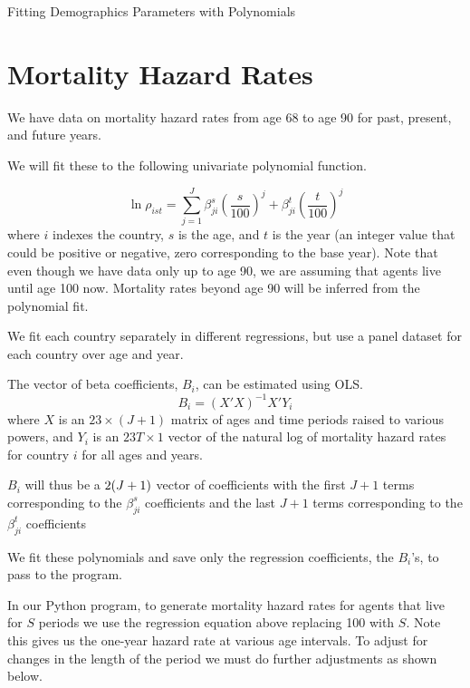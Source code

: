 \documentclass[letterpaper,12pt]{article}
\theoremstyle{definition}
\numberwithin{equation}{section}
\begin{document}
\begin{spacing}{1.5}


\LARGE{Fitting Demographics Parameters with Polynomials} \normalsize

\section{Mortality Hazard Rates}

	We have data on mortality hazard rates from age 68 to age 90 for past, present, and future years.

	We will fit these to the following univariate polynomial function.

	\begin{equation}
		\ln \rho_{ist} = \sum_{j=1}^J \beta^s_{ji} \left(\frac{s}{100}\right)^j + \beta^t_{ji} \left(\frac{t}{100}\right)^j
	\end{equation}
	where $i$ indexes the country, $s$ is the age, and $t$ is the year (an integer value that could be positive or negative, zero corresponding to the base year). Note that even though we have data only up to age 90, we are assuming that agents live until age 100 now.  Mortality rates beyond age 90 will be inferred from the polynomial fit.

	We fit each country separately in different regressions, but use a panel dataset for each country over age and year.

	The vector of beta coefficients, $B_{i}$, can be estimated using OLS.
	\begin{equation}
		B_i = (X'X)^{-1}X'Y_i
	\end{equation}
	where $X$ is an $23 \times(J+1)$ matrix of ages and time periods raised to various powers, and $Y_i$ is an $23T \times 1$ vector of the natural log of mortality hazard rates for country $i$ for all ages and years.

	$B_i$ will thus be a $2(J+1) \time 1$ vector of coefficients with the first $J+1$ terms corresponding to the $\beta^s_{ji}$ coefficients and the last $J+1$ terms corresponding to the $\beta^t_{ji}$ coefficients

	We fit these polynomials and save only the regression coefficients, the $B_i$'s, to pass to the program.

	In our Python program, to generate mortality hazard rates for agents that live for $S$ periods we use the regression equation above replacing 100 with $S$.  Note this gives us the one-year hazard rate at various age intervals.  To adjust for changes in the length of the period we must do further adjustments as shown below.


\end{spacing}
\end{document}
